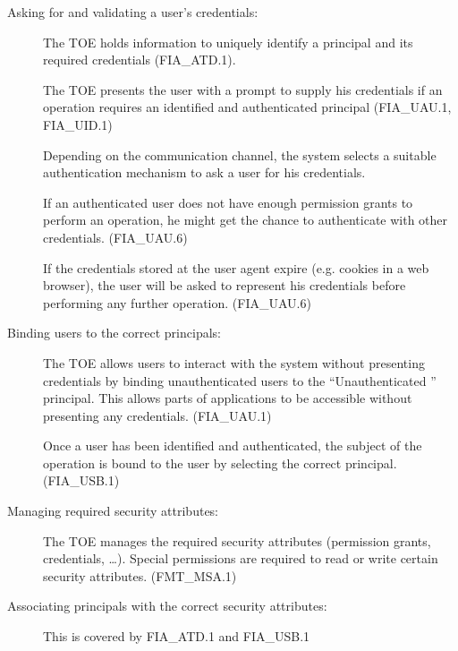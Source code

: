 \documentclass[12pt,english]{scrbook}
\begin{document}
    \begin{description}
        \item[Asking for and validating a user's credentials:]

            The TOE holds information to uniquely identify a principal and its
            required credentials (FIA\_ATD.1).
            
            The TOE presents the user with a prompt to supply his credentials
            if an operation requires an identified and authenticated principal (FIA\_UAU.1, FIA\_UID.1)

            Depending on the communication channel, the system selects a
            suitable authentication mechanism to ask a user for his
            credentials. 

            If an authenticated user does not have enough permission grants to
            perform an operation, he might get the chance to authenticate with
            other credentials. (FIA\_UAU.6)

            If the credentials stored at the user agent expire (e.g.  cookies
            in a web browser), the user will be asked to represent his
            credentials before performing any further operation. (FIA\_UAU.6)

        \item[Binding users to the correct principals:]

            The TOE allows users to interact with the system without presenting
            credentials by binding unauthenticated users to the ``Unauthenticated ''
            principal. This allows parts of applications to be accessible without
            presenting any credentials. (FIA\_UAU.1)

            Once a user has been identified and authenticated, the subject of
            the operation is bound to the user by selecting the correct
            principal. (FIA\_USB.1)

        \item[Managing required security attributes:]

            The TOE manages the required security attributes (permission
            grants, credentials, \dots). Special permissions are required
            to read or write certain security attributes. (FMT\_MSA.1)

        \item[Associating principals with the correct security attributes:]

            This is covered by FIA\_ATD.1 and FIA\_USB.1

    \end{description}
\end{document}
